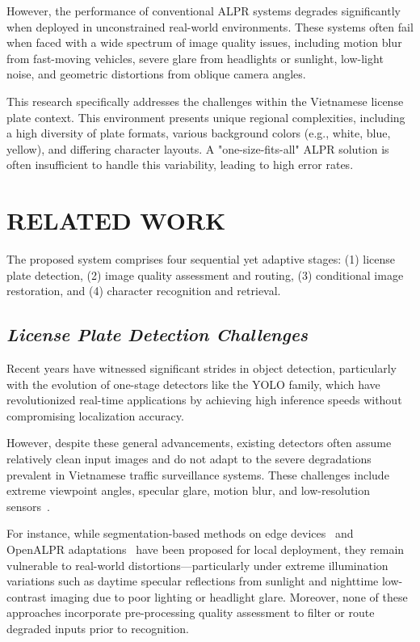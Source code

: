 \documentclass[a4paper,11pt,twocolumn]{article}
\begin{document}
	However, the performance of conventional ALPR systems degrades significantly when deployed in unconstrained real-world environments. These systems often fail when faced with a wide spectrum of image quality issues, including motion blur from fast-moving vehicles, severe glare from headlights or sunlight, low-light noise, and geometric distortions from oblique camera angles.
	
	This research specifically addresses the challenges within the Vietnamese license plate context. This environment presents unique regional complexities, including a high diversity of plate formats, various background colors (e.g., white, blue, yellow), and differing character layouts. A "one-size-fits-all" ALPR solution is often insufficient to handle this variability, leading to high error rates.
	
	\section{RELATED WORK}
	
	The proposed system comprises four sequential yet adaptive stages: (1) license plate detection, (2) image quality assessment and routing, (3) conditional image restoration, and (4) character recognition and retrieval.
	
	\subsection{\textit{License Plate Detection Challenges}}
	
	Recent years have witnessed significant strides in object detection, particularly with the evolution of one-stage detectors like the YOLO family, which have revolutionized real-time applications by achieving high inference speeds without compromising localization accuracy.
	
	However, despite these general advancements, existing detectors often assume relatively clean input images and do not adapt to the severe degradations prevalent in Vietnamese traffic surveillance systems. These challenges include extreme viewpoint angles, specular glare, motion blur, and low-resolution sensors~\cite{TranAnh2023LicensePR}. 
	
	For instance, while segmentation-based methods on edge devices~\cite{Nguyen2025AnIO} and OpenALPR adaptations~\cite{openalpr2023} have been proposed for local deployment, they remain vulnerable to real-world distortions—particularly under extreme illumination variations such as daytime specular reflections from sunlight and nighttime low-contrast imaging due to poor lighting or headlight glare. Moreover, none of these approaches incorporate pre-processing quality assessment to filter or route degraded inputs prior to recognition. 
	
\end{document}
